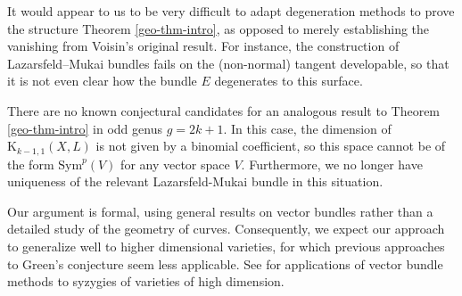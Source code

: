 It would appear to us to be very difficult to adapt degeneration methods to prove the structure Theorem \ref{geo-thm-intro}, as opposed to merely establishing the vanishing from Voisin's original result. For instance, the construction of Lazarsfeld--Mukai bundles fails on the (non-normal) tangent developable, so that it is not even clear how the bundle $E$ degenerates to this surface.

There are no known conjectural candidates for an analogous result to Theorem \ref{geo-thm-intro} in odd genus $g=2k+1$. In this case, the dimension of $\mathrm{K}_{k-1,1}(X,L)$ is not given by a binomial coefficient, so this space cannot be of the form $\mathrm{Sym}^p(V)$ for any vector space $V$. Furthermore, we no longer have uniqueness of the relevant Lazarsfeld-Mukai bundle in this situation.

Our argument is formal, using general results on vector bundles rather than a detailed study of the geometry of curves. Consequently, we expect our approach to generalize well to higher dimensional varieties, for which previous approaches to Green's conjecture seem less applicable. See \cite{ein-laz-arb-dim} for applications of vector bundle methods to syzygies of varieties of high dimension.




